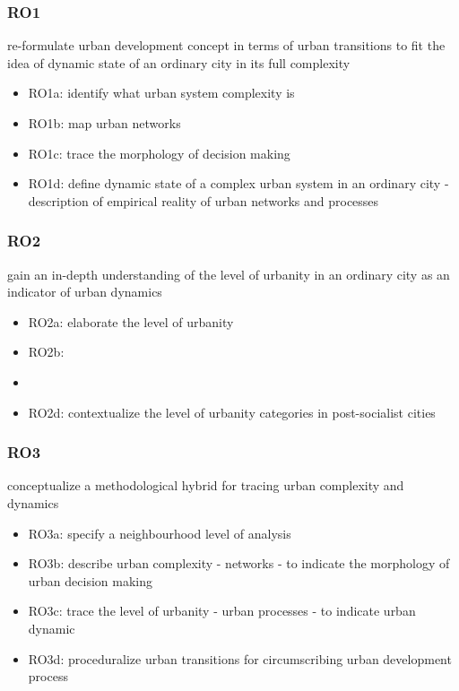 \documentclass[11pt]{report}
\begin{document}
\subsubsection{RO1}
re-formulate urban development concept in terms of urban transitions to fit the idea of dynamic state of an ordinary city in its full complexity
\begin{itemize}
\item RO1a: identify what urban system complexity is  
\item RO1b: map  urban networks
\item RO1c: trace the morphology of decision making 
\item RO1d: define dynamic state of a complex urban system in an ordinary city - description of empirical reality of urban networks and processes
\end{itemize}

\subsubsection{RO2}
gain an in-depth understanding of the level of urbanity in an ordinary city as an indicator of urban dynamics
\begin{itemize}
\item RO2a: elaborate the level of urbanity 
\item RO2b:  
\item {}
\item RO2d: contextualize the level of urbanity categories  in post-socialist cities 
\end{itemize}

\subsubsection{RO3}
conceptualize a methodological hybrid for tracing urban complexity and dynamics
\begin{itemize}
\item RO3a: specify a neighbourhood level of analysis 
\item RO3b: describe urban complexity - networks - to indicate the morphology of urban decision making
\item RO3c: trace the level of urbanity - urban processes - to indicate urban dynamic
\item RO3d: proceduralize urban transitions for circumscribing urban development process
\end{itemize}
\end{document}
